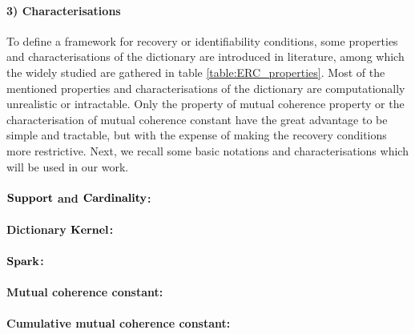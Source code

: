 \paragraph{3) Characterisations}
\label{sec:Conv-Characterization} 
To define a framework for recovery or identifiability conditions, some properties and characterisations of the dictionary are introduced in literature, among which the widely studied are gathered in table \ref{table:ERC_properties}.
Most of the mentioned properties and characterisations of the dictionary are computationally unrealistic or intractable.
Only the property of mutual coherence property or the characterisation of mutual coherence constant have the great advantage to be simple and tractable, but with the expense of making the
recovery conditions more restrictive.
Next, we recall some basic notations and characterisations which will be used in our work.

\paragraph{$\boldsymbol{\mathrm{Support}}$ and $\boldsymbol{\mathrm{Cardinality}}$:}%

\paragraph{Dictionary $\boldsymbol{\mathrm{Kernel}}$:} %

\paragraph{$\boldsymbol{\mathrm{Spark}}$:} %

\paragraph{Mutual coherence constant:} %

\paragraph{Cumulative mutual coherence constant:} %

